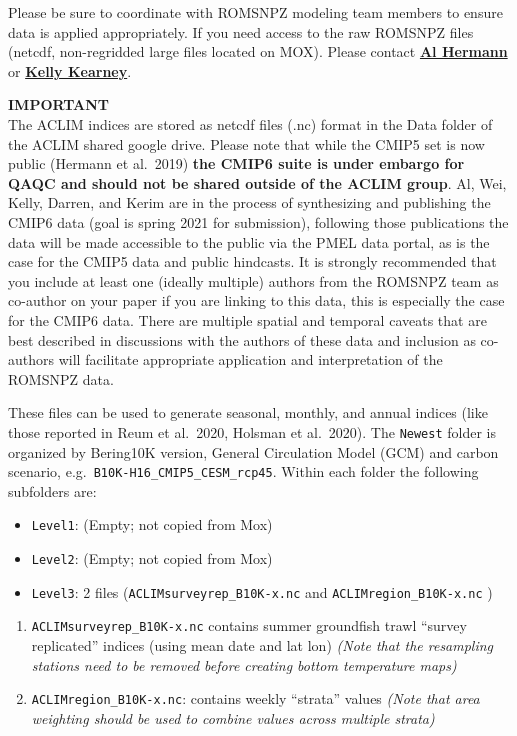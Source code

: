 \documentclass[
]{article}
\providecommand{\tightlist}{%
  \setlength{\itemsep}{0pt}\setlength{\parskip}{0pt}}
\begin{document}
Please be sure to coordinate with ROMSNPZ modeling team members to
ensure data is applied appropriately. If you need access to the raw
ROMSNPZ files (netcdf, non-regridded large files located on MOX). Please
contact \href{albert.j.hermann@noaa.gov}{\textbf{Al Hermann}} or
\href{kelly.kearney@noaa.gov}{\textbf{Kelly Kearney}}.

\textbf{IMPORTANT}\\
The ACLIM indices are stored as netcdf files (.nc) format in the Data
folder of the ACLIM shared google drive. Please note that while the
CMIP5 set is now public (Hermann et al.~2019) \textbf{the CMIP6 suite is
under embargo for QAQC and should not be shared outside of the ACLIM
group}. Al, Wei, Kelly, Darren, and Kerim are in the process of
synthesizing and publishing the CMIP6 data (goal is spring 2021 for
submission), following those publications the data will be made
accessible to the public via the PMEL data portal, as is the case for
the CMIP5 data and public hindcasts. It is strongly recommended that you
include at least one (ideally multiple) authors from the ROMSNPZ team as
co-author on your paper if you are linking to this data, this is
especially the case for the CMIP6 data. There are multiple spatial and
temporal caveats that are best described in discussions with the authors
of these data and inclusion as co-authors will facilitate appropriate
application and interpretation of the ROMSNPZ data.

These files can be used to generate seasonal, monthly, and annual
indices (like those reported in Reum et al.~2020, Holsman et al.~2020).
The \texttt{Newest} folder is organized by Bering10K version, General
Circulation Model (GCM) and carbon scenario,
e.g.~\texttt{B10K-H16\_CMIP5\_CESM\_rcp45}. Within each folder the
following subfolders are:

\begin{itemize}
\tightlist
\item
  \texttt{Level1}: (Empty; not copied from Mox)
\item
  \texttt{Level2}: (Empty; not copied from Mox)
\item
  \texttt{Level3}: 2 files (\texttt{ACLIMsurveyrep\_B10K-x.nc} and
  \texttt{ACLIMregion\_B10K-x.nc} )
\end{itemize}

\begin{enumerate}
\def\labelenumi{\arabic{enumi})}
\tightlist
\item
  \texttt{ACLIMsurveyrep\_B10K-x.nc} contains summer groundfish trawl
  ``survey replicated'' indices (using mean date and lat lon)
  \emph{(Note that the resampling stations need to be removed before
  creating bottom temperature maps)}\\
\item
  \texttt{ACLIMregion\_B10K-x.nc}: contains weekly ``strata'' values
  \emph{(Note that area weighting should be used to combine values
  across multiple strata)}
\end{enumerate}
\end{document}
